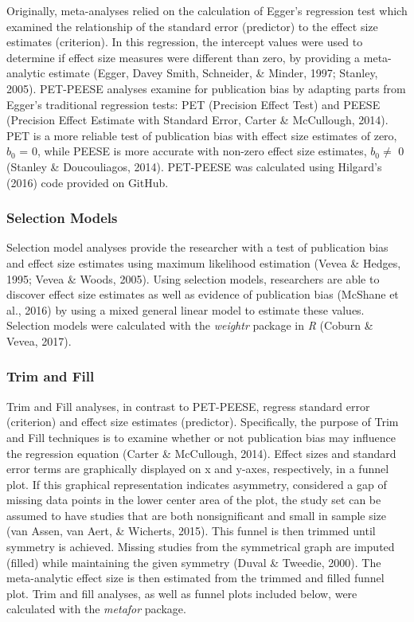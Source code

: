 \documentclass[english,man]{apa6}
\theoremstyle{definition}
\theoremstyle{definition}
\theoremstyle{definition}
\theoremstyle{remark}
\begin{document}
Originally, meta-analyses relied on the calculation of Egger's
regression test which examined the relationship of the standard error
(predictor) to the effect size estimates (criterion). In this
regression, the intercept values were used to determine if effect size
measures were different than zero, by providing a meta-analytic estimate
(Egger, Davey Smith, Schneider, \& Minder, 1997; Stanley, 2005).
PET-PEESE analyses examine for publication bias by adapting parts from
Egger's traditional regression tests: PET (Precision Effect Test) and
PEESE (Precision Effect Estimate with Standard Error, Carter \&
McCullough, 2014). PET is a more reliable test of publication bias with
effect size estimates of zero, \(b_0\) = 0, while PEESE is more accurate
with non-zero effect size estimates, \(b_0 \neq\) 0 (Stanley \&
Doucouliagos, 2014). PET-PEESE was calculated using Hilgard's (2016)
code provided on GitHub.

\subsubsection{Selection Models}\label{selection-models}

Selection model analyses provide the researcher with a test of
publication bias and effect size estimates using maximum likelihood
estimation (Vevea \& Hedges, 1995; Vevea \& Woods, 2005). Using
selection models, researchers are able to discover effect size estimates
as well as evidence of publication bias (McShane et al., 2016) by using
a mixed general linear model to estimate these values. Selection models
were calculated with the \emph{weightr} package in \emph{R} (Coburn \&
Vevea, 2017).

\subsubsection{Trim and Fill}\label{trim-and-fill}

Trim and Fill analyses, in contrast to PET-PEESE, regress standard error
(criterion) and effect size estimates (predictor). Specifically, the
purpose of Trim and Fill techniques is to examine whether or not
publication bias may influence the regression equation (Carter \&
McCullough, 2014). Effect sizes and standard error terms are graphically
displayed on x and y-axes, respectively, in a funnel plot. If this
graphical representation indicates asymmetry, considered a gap of
missing data points in the lower center area of the plot, the study set
can be assumed to have studies that are both nonsignificant and small in
sample size (van Assen, van Aert, \& Wicherts, 2015). This funnel is
then trimmed until symmetry is achieved. Missing studies from the
symmetrical graph are imputed (filled) while maintaining the given
symmetry (Duval \& Tweedie, 2000). The meta-analytic effect size is then
estimated from the trimmed and filled funnel plot. Trim and fill
analyses, as well as funnel plots included below, were calculated with
the \emph{metafor} package.
\end{document}
